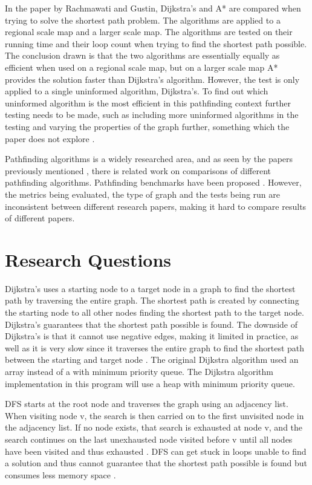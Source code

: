 \documentclass{csfourzero}
\begin{document}
In the paper \cite{rachmawati2020analysis} by Rachmawati and Gustin, Dijkstra's and A* are compared when trying to solve the shortest path problem. The algorithms are applied to a regional scale map and a larger scale map. The algorithms are tested on their running time and their loop count when trying to find the shortest path possible. The conclusion drawn is that the two algorithms are essentially equally as efficient when used on a regional scale map, but on a larger scale map A* provides the solution faster than Dijkstra's algorithm.  However, the test is only applied to a single uninformed algorithm, Dijkstra's. To find out which uninformed algorithm is the most efficient in this pathfinding context further testing needs to be made, such as including more uninformed algorithms in the testing and varying the properties of the graph further, something which the paper does not explore \cite{rachmawati2020analysis}. 

Pathfinding algorithms is a widely researched area, and as seen by the papers previously mentioned , there is related work on comparisons of different pathfinding algorithms. Pathfinding benchmarks have been proposed \cite{6194296}. However, the metrics being evaluated, the type of graph and the tests being run are inconsistent between different research papers, making it hard to compare results of different papers.

\section{Research Questions}
\label{sec:rq}
Dijkstra's uses a starting node to a target node in a graph to find the shortest path by traversing the entire graph. The shortest path is created by connecting the starting node to all other nodes finding the shortest path to the target node. Dijkstra's guarantees that the shortest path possible is found. The downside of Dijkstra's is that it cannot use negative edges, making it limited in practice, as well as it is very slow since it traverses the entire graph to find the shortest path between the starting and target node \cite{ashish2021path}. The original Dijkstra algorithm used an array \cite{dijkstra1959} instead of a with minimum priority queue. The Dijkstra algorithm implementation in this program will use a heap with minimum priority queue. 


DFS starts at the root node and traverses the graph using an adjacency list. When visiting node v, the search is then carried on to the first unvisited node in the adjacency list. If no node exists, that search is exhausted at node v, and the search continues on the last unexhausted node visited before v until all nodes have been visited and thus exhausted \cite{reif1985depth}. DFS can get stuck in loops unable to find a solution and thus cannot guarantee that the shortest path possible is found but consumes less memory space \cite{ashish2021path}. 
\end{document}
